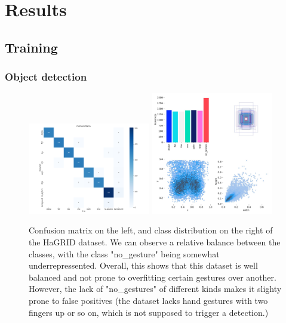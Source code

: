 \documentclass[12pt]{article}
\begin{document}
\section{Results}

\subsection{Training}

\subsubsection{Object detection}

\begin{figure}[H]
  \centering
  \includegraphics[width=0.475\textwidth]{./pictures/smallhands_confusion_matrix.png}
  \hspace{\fill}
  \includegraphics[width=0.475\textwidth]{./pictures/smallhands_labels.jpg}
  \caption{Confusion matrix on the left, and class distribution on the right of the HaGRID dataset. We can observe a relative balance between the classes, with the class "no\_gesture" being somewhat underrepressented. Overall, this shows that this dataset is well balanced and not prone to overfitting certain gestures over another. However, the lack of "no\_gestures" of different kinds makes it slighty prone to false positives (the dataset lacks hand gestures with two fingers up or so on, which is not supposed to trigger a detection.)}
\end{figure}
\end{document}
